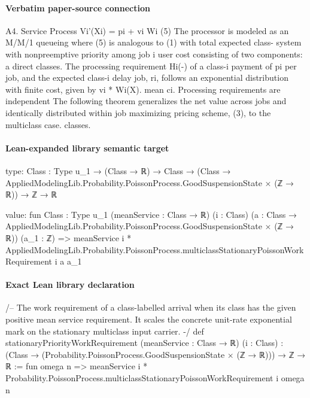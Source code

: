 \documentclass[10pt]{article}
\begin{document}
\paragraph{Verbatim paper-source connection}
\begin{ReviewVerbatim}
A4. Service Process                                                      Vi'(Xi) = pi + vi Wi (5)
The processor is modeled as an M/M/1 queueing                          where (5) is analogous to (1) with total expected class-
system with nonpreemptive priority among job                           i user cost consisting of two components: a direct
classes. The processing requirement Hi(-) of a class-i                 payment of pi per job, and the expected class-i delay
job, ri, follows an exponential distribution with finite cost, given by vi * Wi(X).
mean ci. Processing requirements are independent           The following theorem generalizes the net value
across jobs and identically distributed within job       maximizing pricing scheme, (3), to the multiclass case.
classes.
\end{ReviewVerbatim}



\paragraph{Lean-expanded library semantic target}
\begin{ReviewVerbatim}
type:
{Class : Type u_1} →
  (Class → ℝ) → Class → (Class → AppliedModelingLib.Probability.PoissonProcess.GoodSuspensionState × (ℤ → ℝ)) → ℤ → ℝ

value:
fun {Class : Type u_1} (meanService : Class → ℝ) (i : Class)
    (a : Class → AppliedModelingLib.Probability.PoissonProcess.GoodSuspensionState × (ℤ → ℝ)) (a_1 : ℤ) =>
  meanService i * AppliedModelingLib.Probability.PoissonProcess.multiclassStationaryPoissonWorkRequirement i a a_1
\end{ReviewVerbatim}

\paragraph{Exact Lean library declaration}
\begin{ReviewVerbatim}
/-- The work requirement of a class-labelled arrival when its class has the
given positive mean service requirement.  It scales the concrete unit-rate
exponential mark on the stationary multiclass input carrier. -/
def stationaryPriorityWorkRequirement
    (meanService : Class → ℝ) (i : Class) :
    (Class → (Probability.PoissonProcess.GoodSuspensionState × (ℤ → ℝ))) → ℤ → ℝ :=
  fun omega n => meanService i *
    Probability.PoissonProcess.multiclassStationaryPoissonWorkRequirement i omega n
\end{ReviewVerbatim}
\end{document}
